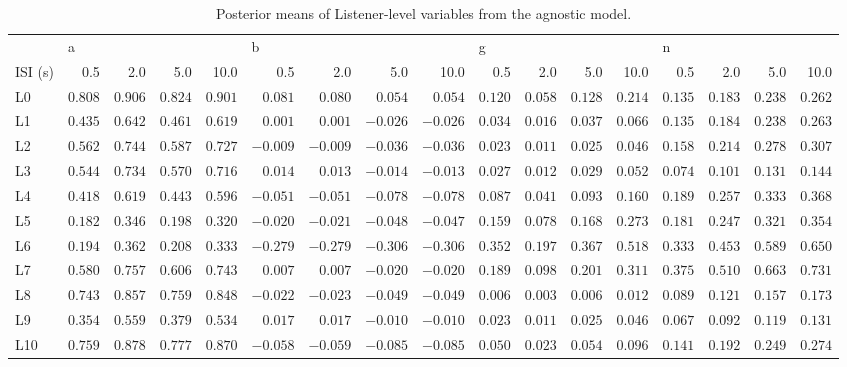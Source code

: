 \begin{table} \centering \caption{Posterior means of Listener-level variables from the agnostic model.} \label{vars} \begin{tabular}{lrrrrrrrrrrrrrrrr} \toprule {} & \multicolumn{4}{l}{a} & \multicolumn{4}{l}{b} & \multicolumn{4}{l}{g} & \multicolumn{4}{l}{n} \\ ISI (s) & 0.5 & 2.0 & 5.0 & 10.0 & 0.5 & 2.0 & 5.0 & 10.0 & 0.5 & 2.0 & 5.0 & 10.0 & 0.5 & 2.0 & 5.0 & 10.0 \\ \midrule L0 & $0.808$ & $0.906$ & $0.824$ & $0.901$ & $0.081$ & $0.080$ & $0.054$ & $0.054$ & $0.120$ & $0.058$ & $0.128$ & $0.214$ & $0.135$ & $0.183$ & $0.238$ & $0.262$ \\ L1 & $0.435$ & $0.642$ & $0.461$ & $0.619$ & $0.001$ & $0.001$ & $-0.026$ & $-0.026$ & $0.034$ & $0.016$ & $0.037$ & $0.066$ & $0.135$ & $0.184$ & $0.238$ & $0.263$ \\ L2 & $0.562$ & $0.744$ & $0.587$ & $0.727$ & $-0.009$ & $-0.009$ & $-0.036$ & $-0.036$ & $0.023$ & $0.011$ & $0.025$ & $0.046$ & $0.158$ & $0.214$ & $0.278$ & $0.307$ \\ L3 & $0.544$ & $0.734$ & $0.570$ & $0.716$ & $0.014$ & $0.013$ & $-0.014$ & $-0.013$ & $0.027$ & $0.012$ & $0.029$ & $0.052$ & $0.074$ & $0.101$ & $0.131$ & $0.144$ \\ L4 & $0.418$ & $0.619$ & $0.443$ & $0.596$ & $-0.051$ & $-0.051$ & $-0.078$ & $-0.078$ & $0.087$ & $0.041$ & $0.093$ & $0.160$ & $0.189$ & $0.257$ & $0.333$ & $0.368$ \\ L5 & $0.182$ & $0.346$ & $0.198$ & $0.320$ & $-0.020$ & $-0.021$ & $-0.048$ & $-0.047$ & $0.159$ & $0.078$ & $0.168$ & $0.273$ & $0.181$ & $0.247$ & $0.321$ & $0.354$ \\ L6 & $0.194$ & $0.362$ & $0.208$ & $0.333$ & $-0.279$ & $-0.279$ & $-0.306$ & $-0.306$ & $0.352$ & $0.197$ & $0.367$ & $0.518$ & $0.333$ & $0.453$ & $0.589$ & $0.650$ \\ L7 & $0.580$ & $0.757$ & $0.606$ & $0.743$ & $0.007$ & $0.007$ & $-0.020$ & $-0.020$ & $0.189$ & $0.098$ & $0.201$ & $0.311$ & $0.375$ & $0.510$ & $0.663$ & $0.731$ \\ L8 & $0.743$ & $0.857$ & $0.759$ & $0.848$ & $-0.022$ & $-0.023$ & $-0.049$ & $-0.049$ & $0.006$ & $0.003$ & $0.006$ & $0.012$ & $0.089$ & $0.121$ & $0.157$ & $0.173$ \\ L9 & $0.354$ & $0.559$ & $0.379$ & $0.534$ & $0.017$ & $0.017$ & $-0.010$ & $-0.010$ & $0.023$ & $0.011$ & $0.025$ & $0.046$ & $0.067$ & $0.092$ & $0.119$ & $0.131$ \\ L10 & $0.759$ & $0.878$ & $0.777$ & $0.870$ & $-0.058$ & $-0.059$ & $-0.085$ & $-0.085$ & $0.050$ & $0.023$ & $0.054$ & $0.096$ & $0.141$ & $0.192$ & $0.249$ & $0.274$ \\ \bottomrule \end{tabular} \end{table}